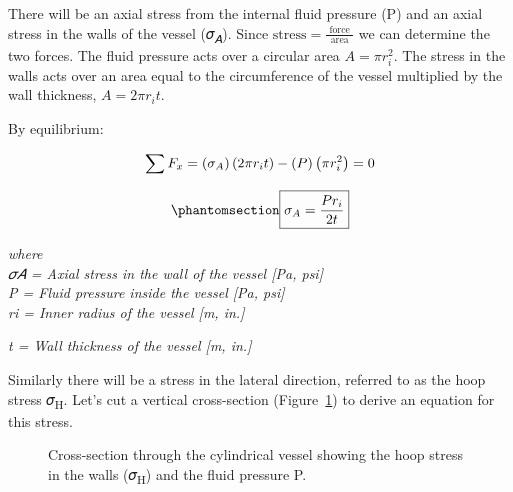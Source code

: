 \documentclass[
  letterpaper,
  DIV=11,
  numbers=noendperiod]{scrreprt}
\theoremstyle{definition}
\theoremstyle{remark}
\begin{document}
There will be an axial stress from the internal fluid pressure (P) and
an axial stress in the walls of the vessel (𝜎\textsubscript{𝐴}). Since
\(\text{stress}=\frac{\text { force }}{\text { area }}\) we can
determine the two forces. The fluid pressure acts over a circular area
\(A=\pi r_i^2\). The stress in the walls acts over an area equal to the
circumference of the vessel multiplied by the wall thickness,
\(A=2 \pi r_i t\).

By equilibrium:

\[
\sum F_x=\left(\sigma_A\right)\left(2 \pi r_i t\right)-(P)\left(\pi r_i^2\right)=0 \\
\]

\begin{equation}\phantomsection\label{eq-13.1}{
\boxed{\sigma_A=\frac{P r_i}{2 t}}
}\end{equation}

\emph{where}\\
\emph{𝜎𝐴 = Axial stress in the wall of the vessel {[}Pa, psi{]}}\\
\emph{P = Fluid pressure inside the vessel {[}Pa, psi{]}}\\
\emph{ri = Inner radius of the vessel {[}m, in.{]}}

\emph{t = Wall thickness of the vessel {[}m, in.{]}}

Similarly there will be a stress in the lateral direction, referred to
as the hoop stress 𝜎\textsubscript{H}. Let's cut a vertical
cross-section (Figure~\ref{fig-13.4}) to derive an equation for this
stress.

\begin{figure}


\caption{\label{fig-13.4}Cross-section through the cylindrical vessel
showing the hoop stress in the walls (𝜎\textsubscript{H}) and the fluid
pressure P.}

\end{figure}%
\end{document}
